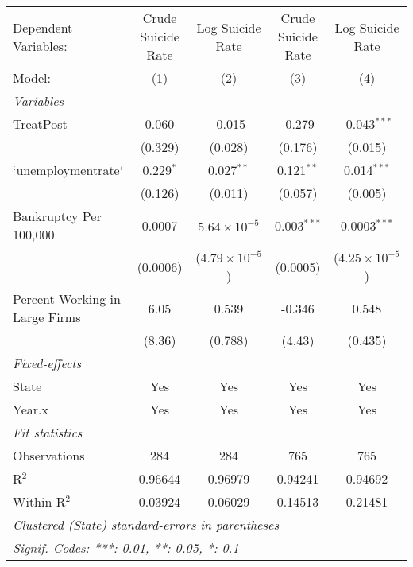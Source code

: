 

\begingroup
\centering
\begin{tabular}{lcccc}
   \tabularnewline \midrule \midrule
   Dependent Variables:           & Crude Suicide Rate & Log Suicide Rate        & Crude Suicide Rate & Log Suicide Rate\\  
   Model:                         & (1)                & (2)                     & (3)                & (4)\\  
   \midrule
   \emph{Variables}\\
   TreatPost                      & 0.060              & -0.015                  & -0.279             & -0.043$^{***}$\\   
                                  & (0.329)            & (0.028)                 & (0.176)            & (0.015)\\   
   `unemploymentrate`             & 0.229$^{*}$        & 0.027$^{**}$            & 0.121$^{**}$       & 0.014$^{***}$\\   
                                  & (0.126)            & (0.011)                 & (0.057)            & (0.005)\\   
   Bankruptcy Per 100,000         & 0.0007             & $5.64\times 10^{-5}$    & 0.003$^{***}$      & 0.0003$^{***}$\\   
                                  & (0.0006)           & ($4.79\times 10^{-5}$)  & (0.0005)           & ($4.25\times 10^{-5}$)\\    
   Percent Working in Large Firms & 6.05               & 0.539                   & -0.346             & 0.548\\   
                                  & (8.36)             & (0.788)                 & (4.43)             & (0.435)\\   
   \midrule
   \emph{Fixed-effects}\\
   State                          & Yes                & Yes                     & Yes                & Yes\\  
   Year.x                         & Yes                & Yes                     & Yes                & Yes\\  
   \midrule
   \emph{Fit statistics}\\
   Observations                   & 284                & 284                     & 765                & 765\\  
   R$^2$                          & 0.96644            & 0.96979                 & 0.94241            & 0.94692\\  
   Within R$^2$                   & 0.03924            & 0.06029                 & 0.14513            & 0.21481\\  
   \midrule \midrule
   \multicolumn{5}{l}{\emph{Clustered (State) standard-errors in parentheses}}\\
   \multicolumn{5}{l}{\emph{Signif. Codes: ***: 0.01, **: 0.05, *: 0.1}}\\
\end{tabular}
\par\endgroup




